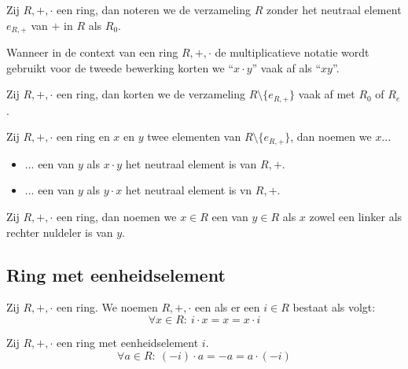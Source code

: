 \documentclass[main.tex]{subfiles}
\begin{document}
\begin{de}
  Zij $R,+,\cdot$ een ring, dan noteren we de verzameling $R$ zonder het neutraal element $e_{R,+}$ van $+$ in $R$ als $R_{0}$.
\end{de}

\begin{de}
  Wanneer in de context van een ring $R,+,\cdot$ de multiplicatieve notatie wordt gebruikt voor de tweede bewerking korten we ``$x \cdot y$'' vaak af als ``$xy$''.
\end{de}

\begin{de}
  Zij $R,+,\cdot$ een ring, dan korten we de verzameling $R\setminus \{e_{R,+}\}$ vaak af met $R_{0}$ of $R_{e}$.
\end{de}

\begin{de}
  Zij $R,+,\cdot$ een ring en $x$ en $y$ twee elementen van $R\setminus \{e_{R,+}\}$, dan noemen we $x$...
  \begin{itemize}
  \item ... een  van $y$ als $x\cdot y$ het neutraal element is van $R,+$.
  \item ... een  van $y$ als $y\cdot x$ het neutraal element is vn $R,+$.
  \end{itemize}
\end{de}

\begin{de}
  Zij $R,+,\cdot$ een ring, dan noemen we $x\in R$ een  van $y\in R$ als $x$ zowel een linker als rechter nuldeler is van $y$.
\end{de}

\subsection{Ring met eenheidselement}
\label{sec:ring-met-eenheidselement}

\begin{de}
  Zij $R,+,\cdot$ een ring.
  We noemen $R,+,\cdot$ een  als er een  $i\in R$ bestaat als volgt:
  \[ \forall x\in R:\ i\cdot x = x = x \cdot i \]
\end{de}

\begin{ei}
  Zij $R,+,\cdot$ een ring met eenheidselement $i$.
  \[ \forall a \in R:\ (-i)\cdot a = -a = a \cdot (-i) \]
\end{ei}
\end{document}
